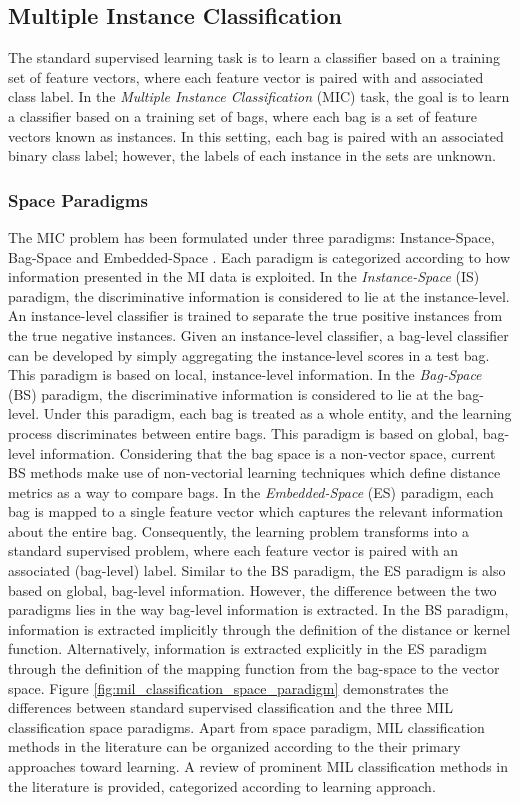 \subsection{Multiple Instance Classification}
The standard supervised learning task is to learn a classifier based on a training set of feature vectors, where each feature vector is paired with and associated class label.  In the \textit{Multiple Instance Classification} (MIC) task, the goal is to learn a classifier based on a training set of bags, where each bag is a set of feature vectors known as instances.  In this setting, each bag is paired with an associated binary class label; however, the labels of each instance in the sets are unknown. 
\subsubsection{Space Paradigms} The MIC problem has been formulated under three paradigms: Instance-Space, Bag-Space and Embedded-Space \citep{Amores2013MIClassification}.  Each paradigm is categorized according to how information presented in the MI data is exploited.  In the \textit{Instance-Space} (IS) paradigm, the discriminative information is considered to lie at the instance-level.  An instance-level classifier is trained to separate the true positive instances from the true negative instances.  Given an instance-level classifier, a bag-level classifier can be developed by simply aggregating the instance-level scores in a test bag.  This paradigm is based on local, instance-level information.  In the \textit{Bag-Space} (BS) paradigm, the discriminative information is considered to lie at the bag-level.  Under this paradigm, each bag is treated as a whole entity, and the learning process discriminates between entire bags.  This paradigm is based on global, bag-level information.  Considering that the bag space is a non-vector space, current BS methods make use of non-vectorial learning techniques which define distance metrics as a way to compare bags.  In the \textit{Embedded-Space} (ES) paradigm, each bag is mapped to a single feature vector which captures the relevant information about the entire bag.  Consequently, the learning problem transforms into a standard supervised problem, where each feature vector is paired with an associated (bag-level) label.  Similar to the BS paradigm, the ES paradigm is also based on global, bag-level information.  However, the difference between the two paradigms lies in the way bag-level information is extracted.  In the BS paradigm, information is extracted implicitly through the definition of the distance or kernel function.  Alternatively, information is extracted explicitly in the ES paradigm through the definition of the mapping function from the bag-space to the vector space.  Figure \ref{fig:mil_classification_space_paradigm} demonstrates the differences between standard supervised classification and the three MIL classification space paradigms. Apart from space paradigm, MIL classification methods in the literature can be organized according to the their primary approaches toward learning. A review of prominent MIL classification methods in the literature is provided, categorized according to learning approach.

